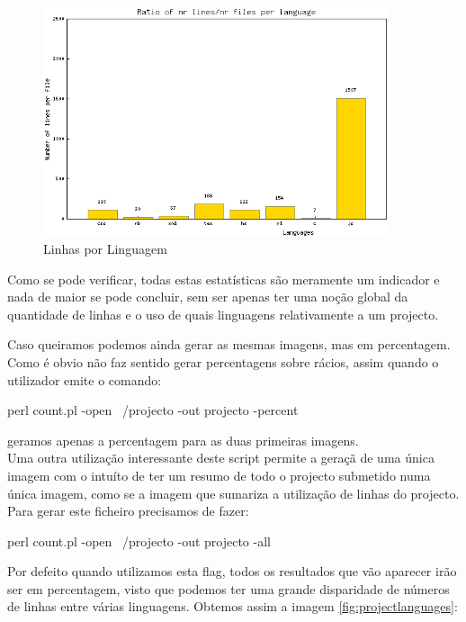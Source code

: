 \begin{figure}[htbp]
\begin{center}
\includegraphics[width=0.9\textwidth]{Images/projecto_RatioFilesLines.png}
\caption{Linhas por Linguagem}\label{fig:ratiofileslines}
\end{center}
\end{figure}

Como se pode verificar, todas estas estatísticas são meramente um indicador e nada de maior se pode concluir, sem ser apenas ter uma
noção global da quantidade de linhas
e o uso de quais linguagens relativamente a um projecto.

Caso queiramos podemos ainda gerar as mesmas imagens, mas em percentagem. Como é obvio não faz sentido gerar percentagens
sobre rácios, assim quando o utilizador
emite o comando:

\begin{code_files}
perl count.pl -open ~/projecto -out projecto -percent
\end{code_files}

geramos apenas a percentagem para as duas primeiras imagens.\\

Uma outra utilização interessante deste script permite a geraçã de uma única imagem com o intuíto de ter um resumo de todo o projecto
submetido numa única imagem, como
se a imagem que sumariza a utilização de linhas do projecto.\\
Para gerar este ficheiro precisamos de fazer:
\begin{code_files}
perl count.pl -open ~/projecto -out projecto -all
\end{code_files}
Por defeito quando utilizamos esta flag, todos os resultados que vão aparecer irão ser em percentagem, visto que podemos ter uma
grande disparidade de números de
linhas entre várias linguagens. Obtemos assim a imagem \ref{fig:projectlanguages}:

